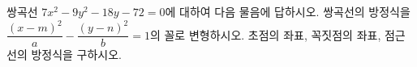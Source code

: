 쌍곡선 $7x^2-9y^2-18y-72=0$에 대하여 다음 물음에 답하시오.
 쌍곡선의 방정식을 $\dfrac{(x-m)^2}{a}-\dfrac{(y-n)^2}{b}=1$의 꼴로 변형하시오.
 초점의 좌표, 꼭짓점의 좌표, 점근선의 방정식을 구하시오.
